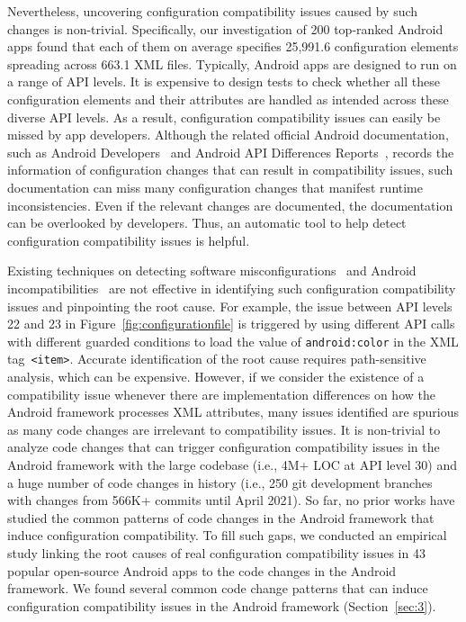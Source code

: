 Nevertheless, uncovering configuration compatibility issues caused by such changes is non-trivial.
Specifically, our investigation of 200 top-ranked Android apps found that each of them on average specifies 25,991.6 configuration elements spreading across 663.1 XML files.
Typically, Android apps are designed to run on a range of API levels. It is expensive to design tests to check whether all these configuration elements and their attributes are handled as intended across these diverse API levels.
As a result, configuration compatibility issues can easily be missed by app developers.
Although the related official Android documentation, such as Android Developers~\cite{androiddevelopers} and Android API Differences Reports~\cite{differencereport}, records the information of configuration changes that can result in compatibility issues, such documentation can miss many configuration changes that manifest runtime inconsistencies. 
Even if the relevant changes are documented, the documentation can be overlooked by developers.
Thus, an automatic tool to help detect configuration compatibility issues is helpful.

Existing techniques on detecting software misconfigurations~\cite{rabkin2011static, xu2013not, behrang2015users,xu2016early, dong2016orplocator, chen2020understanding, toman2016staccato, reisner2010using} and Android incompatibilities~\cite{fazzini2017automated,ki2019mimic, wei2016taming, wei2018understanding, wei2019pivot, huang2018understanding, li2018cid, he2018understanding, li2018elegant} are not effective in identifying such configuration compatibility issues and pinpointing the root cause.
For example, the issue between API levels 22 and 23 in Figure~\ref{fig:configurationfile} is triggered by using different API calls with different guarded conditions to load the value of \texttt{android:color} in the XML tag~\texttt{<item>}. %
Accurate identification of the root cause requires path-sensitive analysis, which can be expensive.
However, if we consider the existence of a compatibility issue whenever there are implementation differences on how the Android framework processes XML attributes, many issues identified are spurious as many code changes are irrelevant to compatibility issues.
It is non-trivial to analyze code changes that can trigger configuration compatibility issues in the Android framework with the large codebase (i.e., 4M+ LOC at API level 30) and a huge number of code changes in history (i.e., 250 git development branches with changes from 566K+ commits until April 2021).
So far, no prior works have studied the common patterns of code changes in the Android framework that induce configuration compatibility.
To fill such gaps, we conducted an empirical study linking the root causes of real configuration compatibility issues in 43 popular open-source Android apps to the code changes in the Android framework. We found several common code change patterns that can induce configuration compatibility issues in the Android framework (Section~\ref{sec:3}). %

